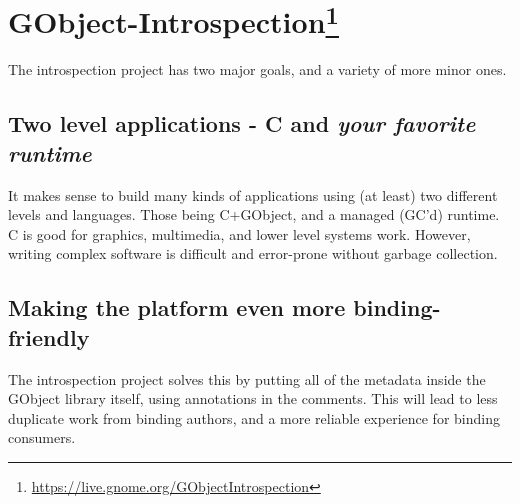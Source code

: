 
\section[GObject-Introspection]{GObject-Introspection\footnote{\url{https://live.gnome.org/GObjectIntrospection}}}\label{sec:g-i}

The introspection project has two major goals, and a variety of more minor ones.

\subsection{Two level applications - C and \emph{your favorite runtime}}

It makes sense to build many kinds of applications using (at least) two different levels and languages. Those being C+GObject, and a managed (GC'd) runtime. C is good for graphics, multimedia, and lower level systems work. However, writing complex software is difficult and error-prone without garbage collection.

\subsection{Making the platform even more binding-friendly}

The introspection project solves this by putting all of the metadata inside the GObject library itself, using annotations in the comments. This will lead to less duplicate work from binding authors, and a more reliable experience for binding consumers.
